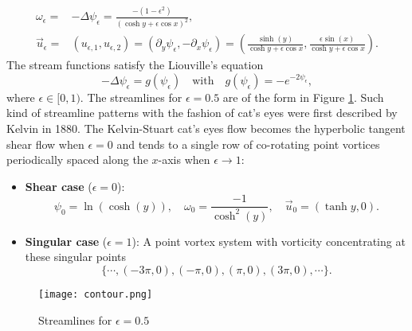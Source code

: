 \documentclass[1 [leqno, 11pt]{amsart}
\numberwithin{equation}{section}
\let\ep=\epsilon
\begin{document}
\begin{CJK*}{GBK}{song}
\begin{align}
\omega_\epsilon =& -\Delta \psi_\epsilon = \frac{-(1- \epsilon^2 )}{(\cosh y + \epsilon\cos x)^2},\\\label{steadyv}
\vec{u}_\epsilon =& (u_{\ep,1},u_{\ep,2})= (\partial_y\psi_{\epsilon }, -\partial_x\psi_{\epsilon })= \left(\frac{\sinh(y)}{\cosh y + \epsilon\cos x}, \frac{\epsilon\sin(x)}{\cosh y + \epsilon\cos x}\right).
\end{align}
  The stream functions  satisfy the  Liouville's equation
 \begin{equation}\label{elip}
  - \Delta \psi_\epsilon = g(\psi_\epsilon)\quad \text{with}\quad g(\psi_\epsilon) =- e^{-2\psi_\epsilon},
 \end{equation}
 where $\ep\in[0,1)$.
 The streamlines for $\ep = 0.5$ are of the form in Figure \ref{fig:firstFig}. Such kind of streamline patterns with the fashion of cat's eyes   were first described by Kelvin \cite{kelvin1880disturbing} in 1880.
  The  Kelvin-Stuart  cat's eyes flow becomes  the  hyperbolic tangent shear flow when $\ep=0$ and tends to  a single row of
co-rotating point vortices  periodically spaced along the $x$-axis when $\ep\to1$:
\begin{itemize}
\item \textbf{Shear case} ($\epsilon = 0$):  $$\psi_0 = \ln(\cosh (y)), \quad \omega_0 =\frac{-1}{\cosh ^2 (y)}, \quad \vec{u}_0 = (\tanh y, 0).$$
\item \textbf{Singular case} ($\epsilon =1$): A point vortex system with vorticity concentrating at these singular points $$\{\cdots,(-3\pi,0),(-\pi,0),(\pi, 0), (3\pi,0),\cdots\}.$$
\end{itemize}

\begin{figure}[ht]
    \centering
\texttt{[image: contour.png]}
\caption{Streamlines  for $\ep=0.5$}
	\label{fig:firstFig}
\end{figure}


\end{CJK*}
\end{document}
